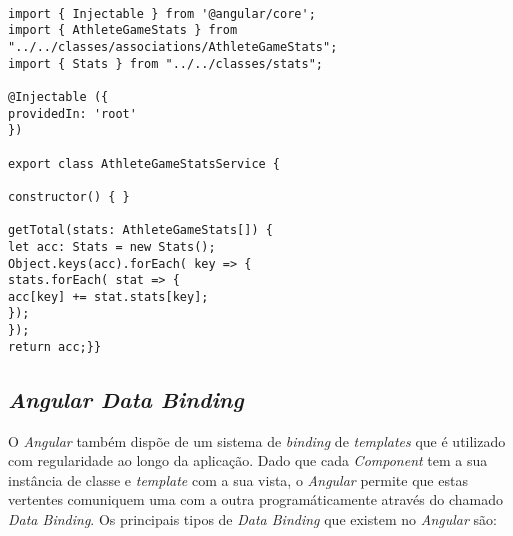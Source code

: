 \begin{lstlisting}

import { Injectable } from '@angular/core';
import { AthleteGameStats } from "../../classes/associations/AthleteGameStats";
import { Stats } from "../../classes/stats";

@Injectable ({
providedIn: 'root'
})

export class AthleteGameStatsService {

constructor() { }

getTotal(stats: AthleteGameStats[]) {
let acc: Stats = new Stats();
Object.keys(acc).forEach( key => {
stats.forEach( stat => {
acc[key] += stat.stats[key];
});
});
return acc;}}
\end{lstlisting}

\subsection{\textit{Angular Data Binding}}\label{subsec413}

O \textit{Angular} também dispõe de um sistema de \textit{binding} de \textit{templates} que é utilizado com regularidade ao longo da aplicação. Dado que cada \textit{Component} tem a sua instância de classe e \textit{template} com a sua vista, o \textit{Angular} permite que estas vertentes comuniquem uma com a outra programáticamente através do chamado \textit{Data Binding}. 
Os principais tipos de \textit{Data Binding} que existem no \textit{Angular} são: \\

